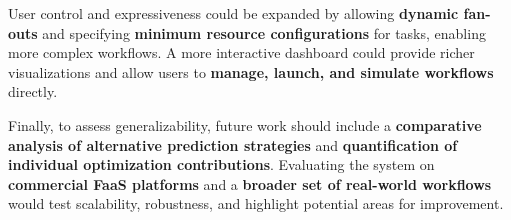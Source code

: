 \documentclass[conference]{IEEEtran}
\begin{document}
User control and expressiveness could be expanded by allowing \textbf{dynamic fan-outs} and specifying \textbf{minimum resource configurations} for tasks, enabling more complex workflows. A more interactive dashboard could provide richer visualizations and allow users to \textbf{manage, launch, and simulate workflows} directly.

Finally, to assess generalizability, future work should include a \textbf{comparative analysis of alternative prediction strategies} and \textbf{quantification of individual optimization contributions}. Evaluating the system on \textbf{commercial FaaS platforms} and a \textbf{broader set of real-world workflows} would test scalability, robustness, and highlight potential areas for improvement.




\clearpage
\onecolumn
\appendix
\end{document}
